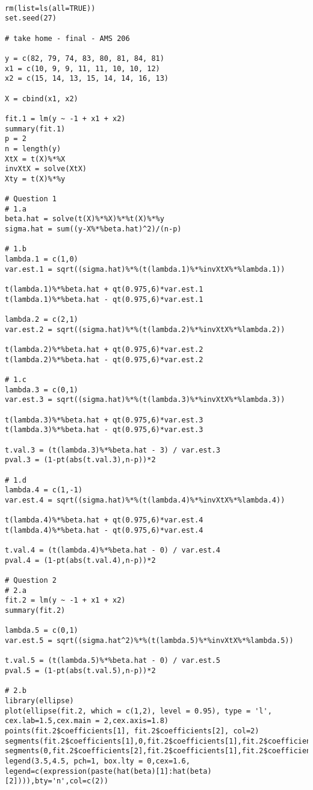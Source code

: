 \documentclass[a4paper, 11pt]{article}
\begin{document}
\begin{verbatim}

rm(list=ls(all=TRUE))
set.seed(27)

# take home - final - AMS 206

y = c(82, 79, 74, 83, 80, 81, 84, 81)
x1 = c(10, 9, 9, 11, 11, 10, 10, 12)
x2 = c(15, 14, 13, 15, 14, 14, 16, 13)

X = cbind(x1, x2)

fit.1 = lm(y ~ -1 + x1 + x2) 
summary(fit.1)
p = 2
n = length(y)
XtX = t(X)%*%X
invXtX = solve(XtX)
Xty = t(X)%*%y

# Question 1
# 1.a
beta.hat = solve(t(X)%*%X)%*%t(X)%*%y
sigma.hat = sum((y-X%*%beta.hat)^2)/(n-p)

# 1.b
lambda.1 = c(1,0)
var.est.1 = sqrt((sigma.hat)%*%(t(lambda.1)%*%invXtX%*%lambda.1))

t(lambda.1)%*%beta.hat + qt(0.975,6)*var.est.1
t(lambda.1)%*%beta.hat - qt(0.975,6)*var.est.1

lambda.2 = c(2,1)
var.est.2 = sqrt((sigma.hat)%*%(t(lambda.2)%*%invXtX%*%lambda.2))

t(lambda.2)%*%beta.hat + qt(0.975,6)*var.est.2
t(lambda.2)%*%beta.hat - qt(0.975,6)*var.est.2

# 1.c
lambda.3 = c(0,1)
var.est.3 = sqrt((sigma.hat)%*%(t(lambda.3)%*%invXtX%*%lambda.3))

t(lambda.3)%*%beta.hat + qt(0.975,6)*var.est.3
t(lambda.3)%*%beta.hat - qt(0.975,6)*var.est.3

t.val.3 = (t(lambda.3)%*%beta.hat - 3) / var.est.3
pval.3 = (1-pt(abs(t.val.3),n-p))*2

# 1.d
lambda.4 = c(1,-1)
var.est.4 = sqrt((sigma.hat)%*%(t(lambda.4)%*%invXtX%*%lambda.4))

t(lambda.4)%*%beta.hat + qt(0.975,6)*var.est.4
t(lambda.4)%*%beta.hat - qt(0.975,6)*var.est.4

t.val.4 = (t(lambda.4)%*%beta.hat - 0) / var.est.4
pval.4 = (1-pt(abs(t.val.4),n-p))*2

# Question 2
# 2.a
fit.2 = lm(y ~ -1 + x1 + x2)
summary(fit.2)

lambda.5 = c(0,1)
var.est.5 = sqrt((sigma.hat^2)%*%(t(lambda.5)%*%invXtX%*%lambda.5))

t.val.5 = (t(lambda.5)%*%beta.hat - 0) / var.est.5
pval.5 = (1-pt(abs(t.val.5),n-p))*2

# 2.b
library(ellipse)
plot(ellipse(fit.2, which = c(1,2), level = 0.95), type = 'l', 
cex.lab=1.5,cex.main = 2,cex.axis=1.8)
points(fit.2$coefficients[1], fit.2$coefficients[2], col=2)
segments(fit.2$coefficients[1],0,fit.2$coefficients[1],fit.2$coefficients[2])
segments(0,fit.2$coefficients[2],fit.2$coefficients[1],fit.2$coefficients[2])
legend(3.5,4.5, pch=1, box.lty = 0,cex=1.6, 
legend=c(expression(paste(hat(beta)[1]:hat(beta)[2]))),bty='n',col=c(2))


\end{verbatim}
\end{document}
